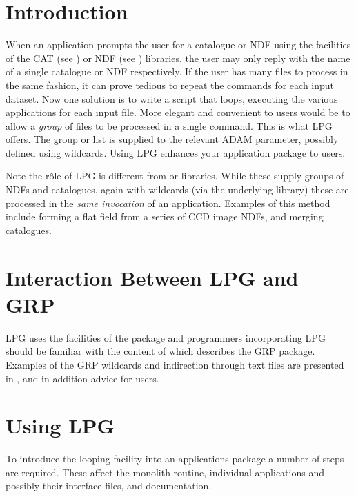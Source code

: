 \documentclass[twoside,11pt]{starlink}
\begin{document}
\scfrontmatter

\section {Introduction}

When an application prompts the user for a catalogue or NDF using the
facilities of the CAT (see ) or NDF (see
) libraries, the user may only reply with the
name of a single catalogue or NDF respectively.  If the user has many
files to process in the same fashion, it can prove tedious to repeat
the commands for each input dataset.  Now one solution is to write a
script that loops, executing the various applications for each input
file.  More elegant and convenient to users would be to allow a
\emph{group} of files to be processed in a single command.  This is
what LPG offers.  The group or list is supplied to the relevant ADAM
parameter, possibly defined using wildcards.  Using LPG enhances your
application package to users.

Note the r\^{o}le of LPG is different from  or
 libraries.  While these supply groups of NDFs and
catalogues, again with wildcards (via the underlying
 library) these are processed in the \emph{same
invocation} of an application. Examples of this method include forming
a flat field from a series of CCD image NDFs, and merging catalogues.

\section {Interaction Between LPG and GRP}

LPG uses the facilities of the  package and
programmers incorporating LPG should be familiar with the content of
 which describes the GRP package.
Examples of the GRP wildcards and indirection through text files
are presented in , and in addition
advice for users.

\newpage
\section{Using LPG}

To introduce the looping facility into an applications package
a number of steps are required.  These affect the monolith routine,
individual applications and possibly their interface files, and
documentation.
\end{document}
